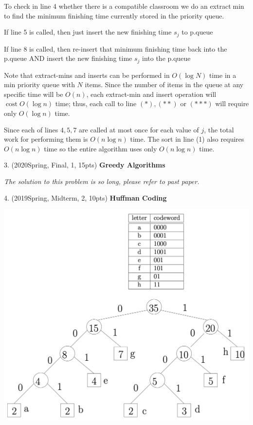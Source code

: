 \begin{spacing}{1.3}
    To check in line 4 whether there is a compatible classroom we do an extract$\min$ to find the minimum finishing time currently stored in the priority queue.
    
    If line 5 is called, then just insert the new finishing time $s_{j}$ to p.queue
    
    If line 8 is called, then re-insert that minimum finishing time back into the p.queue AND insert the new finishing time $s_{j}$ into the p.queue
    
    Note that extract-mins and inserts can be performed in $O(\log N)$ time in a min priority queue with $N$ items. Since the number of items in the queue at any specific time will be $O(n)$, each extract-min and insert operation will $\operatorname{cost} O(\log n)$ time; thus, each call to line $(*),(* *)$ or $(* * *)$ will require only $O(\log n)$ time.
    
    Since each of lines $4,5,7$ are called at most once for each value of $j$, the total work for performing them is $O(n \log n)$ time. The sort in line (1) also requires $O(n \log n)$ time so the entire algorithm uses only $O(n \log n)$ time.


    \vspace{0.5in}
    3. (2020Spring, Final, 1, 15pts) {\bf Greedy Algorithms} 

    {\it The solution to this problem is so long, please refer to past paper.}

    \vspace{0.5in}
    4. (2019Spring, Midterm, 2, 10pts) {\bf Huffman Coding}

    \includegraphics[scale=0.55]{images/07-exercise-2019s-huffman-sol.png}


\end{spacing}
